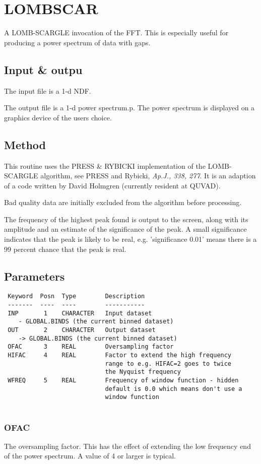 \documentclass{book}
\renewcommand{\_}{{\tt\char'137}}     %
\begin{document}
\section{LOMBSCAR}
A LOMB-SCARGLE invocation of the FFT. This is especially useful
for producing a power spectrum of data with gaps.
 
\subsection{Input \& outpu}
The input file is a 1-d NDF.
 
The output file is a 1-d power spectrum.p.
The power spectrum is displayed on a graphics device of the users
choice.
 
\subsection{Method}
This routine uses the PRESS \& RYBICKI implementation of the
LOMB-SCARGLE algorithm, see PRESS and Rybicki, {\em Ap.J., 338, 277}.
It is an adaption of a code written by David Holmgren
(currently resident at QUVAD).
 
Bad quality data are initially excluded from the algorithm
before processing.
 
The frequency of the highest peak found is output to the screen,
along with its amplitude and an estimate of the significance of
the peak. A small significance indicates that the peak is likely
to be real, e.g. 'significance 0.01' means there is a 99 percent
chance that the peak is real.
 
\subsection{Parameters}
\begin{verbatim}
 Keyword  Posn  Type        Description
 -------  ----  ----        -----------
 INP       1    CHARACTER   Input dataset
    - GLOBAL.BINDS (the current binned dataset)
 OUT       2    CHARACTER   Output dataset
    -> GLOBAL.BINDS (the current binned dataset)
 OFAC      3    REAL        Oversampling factor
 HIFAC     4    REAL        Factor to extend the high frequency
                            range to e.g. HIFAC=2 goes to twice
                            the Nyquist frequency
 WFREQ     5    REAL        Frequency of window function - hidden
                            default is 0.0 which means don't use a
                            window function
 
\end{verbatim}\subsubsection{OFAC}
The oversampling factor. This has the effect of extending the low
frequency end of the power spectrum. A value of 4 or larger is
typical.
 
\end{document}
